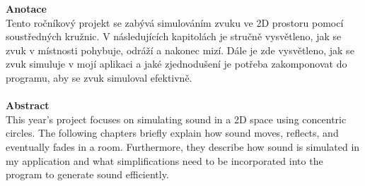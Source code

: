 \textbf{\large Anotace}\\
Tento ročníkový projekt se zabývá simulováním zvuku ve 2D prostoru pomocí soustředných kružnic. V následujících kapitolách je stručně vysvětleno, jak se zvuk v místnosti pohybuje, odráží a nakonec mizí. Dále je zde vysvětleno, jak se zvuk simuluje v mojí aplikaci a jaké zjednodušení je potřeba zakomponovat do programu, aby se zvuk simuloval efektivně. 
\\
\\
\textbf{\large Abstract}\\
This year's project focuses on simulating sound in a 2D space using concentric circles. The following chapters briefly explain how sound moves, reflects, and eventually fades in a room. Furthermore, they describe how sound is simulated in my application and what simplifications need to be incorporated into the program to generate sound efficiently.